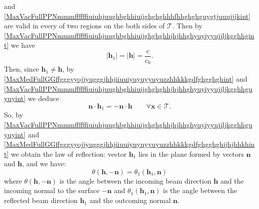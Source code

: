 \documentclass{article}
\theoremstyle{definition}
\theoremstyle{remark}
\renewcommand{\vec}[1]{\mathbf{#1}}
\newcommand{\er}{\eqref}
\newcommand{\er}{\eqref}
\begin{document}
and
\er{MaxVacFullPPNmmmffffffiuiuhjuughbghhiuijghghghhhfhhghghguygtjuuujjjkint}
are valid in every of two regions on the both sides of
$\mathcal{T}$. Then by
\er{MaxVacFullPPNmmmffffffiuiuhjuughbghhiuijghghghhjhjhhghyuyiyyujjljkgghhgint}
we have
\begin{equation}\label{MaxVacFullPPNmmmffffffiuiuhjuughbghhiuijghghghhjhjhhghyuyiyyujjljkgghhguyuyint}
|\vec h_1|=|\vec h|=\frac{c}{c_0}.
\end{equation}
Then, since $\vec h_1\neq\vec h$, by
\er{MaxMedFullGGffgggyyojjyugggjhhjiiuuiyuyuyyuyuzzhhkkkgdfghgghghint}
and
\er{MaxVacFullPPNmmmffffffiuiuhjuughbghhiuijghghghhjhjhhghyuyiyyujjljkgghhguyuyint}
we deduce
\begin{equation}\label{MaxMedFullGGffgggyyojjyugggjhhjiiuuiyuyuyyuyuzzhhkkkgdfghgghghijhjhhkhint}
\vec n\cdot \vec h_1=-\vec n\cdot \vec h\quad\quad\forall\vec
x\in\mathcal{T}.
\end{equation}
So, by
\er{MaxVacFullPPNmmmffffffiuiuhjuughbghhiuijghghghhjhjhhghyuyiyyujjljkgghhguyuyint}
and
\er{MaxMedFullGGffgggyyojjyugggjhhjiiuuiyuyuyyuyuzzhhkkkgdfghgghghijhjhhkhint}
we obtain the law of reflection: vector $\vec h_1$ lies in the plane
formed by vectors $\vec n$ and $\vec h$, and we have:
\begin{equation}\label{MaxMedFulljhhjjjjjint}
\theta\left(\vec h,-\vec n\right)=\theta_1\left(\vec h_1,\vec
n\right)
\end{equation}
where $\theta\left(\vec h,-\vec n\right)$ is the angle between the
incoming beam direction $\vec h$ and the incoming normal to the
surface $-\vec n$ and $\theta_1\left(\vec h_1,\vec n\right)$ is the
angle between the reflected beam direction $\vec h_1$ and the
outcoming normal $\vec n$.
\end{document}
